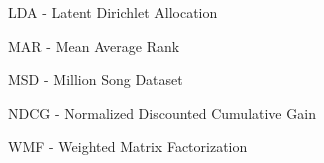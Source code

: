 LDA - Latent Dirichlet Allocation

MAR - Mean Average Rank

MSD - Million Song Dataset

NDCG - Normalized Discounted Cumulative Gain

WMF - Weighted Matrix Factorization